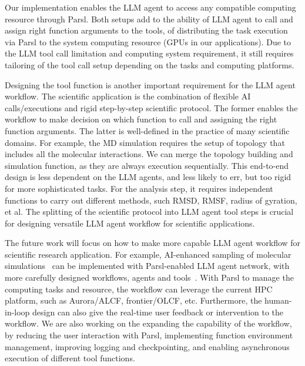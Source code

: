 Our implementation enables the LLM agent to access any compatible computing resource through Parsl.
Both setups add to the ability of LLM agent to call and assign right function arguments to the tools, of distributing the task execution via Parsl to the system computing resource (GPUs in our applications). 
Due to the LLM tool call limitation and computing system requirement, it still requires tailoring of the tool call setup depending on the tasks and computing platforms. 

Designing the tool function is another important requirement for the LLM agent workflow. 
The scientific application is the combination of flexible AI calls/executions and rigid step-by-step scientific protocol. 
The former enables the workflow to make decision on which function to call and assigning the right function arguments. 
The latter is well-defined in the practice of many scientific domains. 
For example, the MD simulation requires the setup of topology that includes all the molecular interactions. 
We can merge the topology building and simulation function, as they are always execution sequentially. 
This end-to-end design is less dependent on the LLM agents, and less likely to err, but too rigid for more sophisticated tasks. 
For the analysis step, it requires independent functions to carry out different methods, such RMSD, RMSF, radius of gyration, et al. 
The splitting of the scientific protocol into LLM agent tool steps is crucial for designing versatile LLM agent workflow for scientific applications. 

The future work will focus on how to make more capable LLM agent workflow for scientific research application. 
For example, AI-enhanced sampling of molecular simulations~\cite{ma2020deep_ddmd,brace2022coupling_ddmd,lee2019deepdrivemd_ddmd} can be implemented with Parsl-enabled LLM agent network, with more carefully designed workflows, agents and tools~\cite{nadeem2024optimizing_policy}. 
With Parsl to manage the computing tasks and resource, the workflow can leverage the current HPC platform, such as Aurora/ALCF, frontier/OLCF, etc. 
Furthermore, the human-in-loop design can also give the real-time user feedback or intervention to the workflow. 
We are also working on the expanding the capability of the workflow, by reducing the user interaction with Parsl, implementing function environment management, improving logging and checkpointing, and enabling asynchronous execution of different tool functions. 




